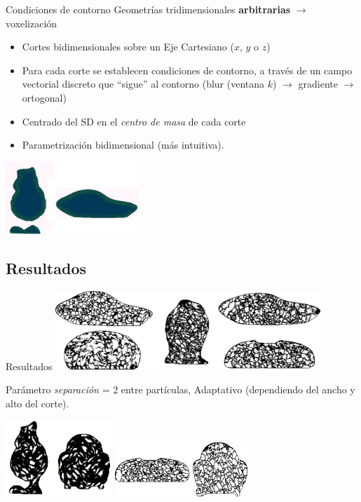 \documentclass[spanish,unknownkeysallowed,10pt]{beamer}
\begin{document}
\begin{frame}{Condiciones de contorno}
Geometrías tridimensionales \textbf{arbitrarias} $\rightarrow$ voxelización

\begin{itemize}
\item Cortes bidimensionales sobre un Eje Cartesiano ($x$, $y$ o $z$)
\item Para cada corte se establecen condiciones de contorno, a través de un campo vectorial discreto que ``sigue'' al contorno (blur (ventana $k$) $\rightarrow$ gradiente $\rightarrow$ ortogonal)
\item Centrado del SD en el {\em centro de masa} de cada corte
\item Parametrización bidimensional (más intuitiva).

\end{itemize}

  \centerline{\includegraphics[width=5cm]{../figures/Fig4}}
\end{frame}


\subsection{Resultados}

\begin{frame}{Resultados}
\includegraphics[width=10cm]{../figures/Fig5}

Parámetro {\em separación} = 2 entre partículas, Adaptativo (dependiendo del ancho y alto del corte).

\includegraphics[width=4cm]{../figures/Fig7}
\includegraphics[width=5cm]{../figures/Fig6}





\end{frame}
\end{document}
